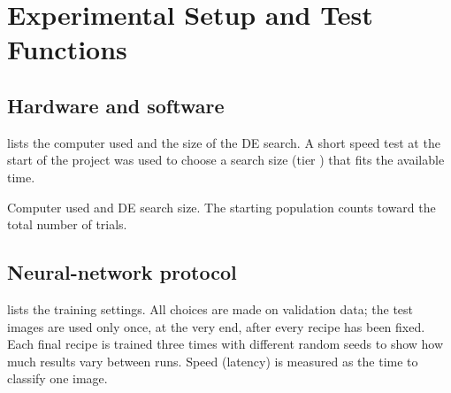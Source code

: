 \chapter{Experimental Setup and Test Functions}
\section{Hardware and software}
 lists the computer used and the size of the DE search. A short speed test at the start of the project was used to choose a search size (tier \ComputeTier) that fits the available time.

\begin{table}[htbp]\centering\small
\caption{Computer used and DE search size. The starting population counts toward the total number of trials.}\label{tab:system}\label{tab:budget}
\begin{minipage}[t]{.61\linewidth}\vspace{0pt}\centering
\begin{adjustbox}{max width=\linewidth}\end{adjustbox}
\end{minipage}\hfill
\begin{minipage}[t]{.35\linewidth}\vspace{0pt}\centering
\begin{adjustbox}{max width=\linewidth}\end{adjustbox}
\end{minipage}
\end{table}

\section{Neural-network protocol}


 lists the training settings. All choices are made on validation data; the test images are used only once, at the very end, after every recipe has been fixed. Each final recipe is trained three times with different random seeds to show how much results vary between runs. Speed (latency) is measured as the time to classify one image.


